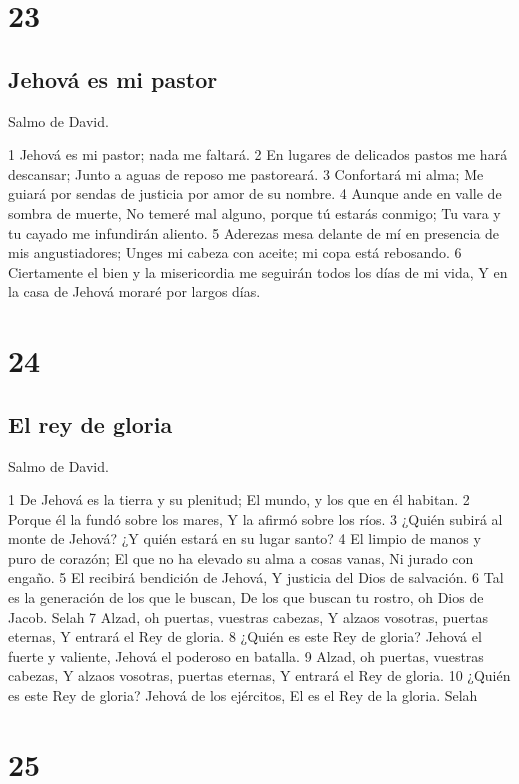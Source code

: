 \chapter{23}

\section*{Jehová es mi pastor}

Salmo de David.

1 Jehová es mi pastor; nada me faltará.
2 En lugares de delicados pastos me hará descansar;
Junto a aguas de reposo me pastoreará.
3 Confortará mi alma;
Me guiará por sendas de justicia por amor de su nombre.
4 Aunque ande en valle de sombra de muerte,
No temeré mal alguno, porque tú estarás conmigo;
Tu vara y tu cayado me infundirán aliento.
5 Aderezas mesa delante de mí en presencia de mis angustiadores;
Unges mi cabeza con aceite; mi copa está rebosando.
6 Ciertamente el bien y la misericordia me seguirán todos los días de mi vida,
Y en la casa de Jehová moraré por largos días.

\chapter{24}

\section*{El rey de gloria}

Salmo de David.

1 De Jehová es la tierra y su plenitud;
El mundo, y los que en él habitan.
2 Porque él la fundó sobre los mares,
Y la afirmó sobre los ríos.
3 ¿Quién subirá al monte de Jehová?
¿Y quién estará en su lugar santo?
4 El limpio de manos y puro de corazón;
El que no ha elevado su alma a cosas vanas,
Ni jurado con engaño.
5 El recibirá bendición de Jehová,
Y justicia del Dios de salvación.
6 Tal es la generación de los que le buscan,
De los que buscan tu rostro, oh Dios de Jacob. Selah
7 Alzad, oh puertas, vuestras cabezas,
Y alzaos vosotras, puertas eternas,
Y entrará el Rey de gloria.
8 ¿Quién es este Rey de gloria?
Jehová el fuerte y valiente,
Jehová el poderoso en batalla.
9 Alzad, oh puertas, vuestras cabezas,
Y alzaos vosotras, puertas eternas,
Y entrará el Rey de gloria.
10 ¿Quién es este Rey de gloria?
Jehová de los ejércitos,
El es el Rey de la gloria. Selah

\chapter{25}

